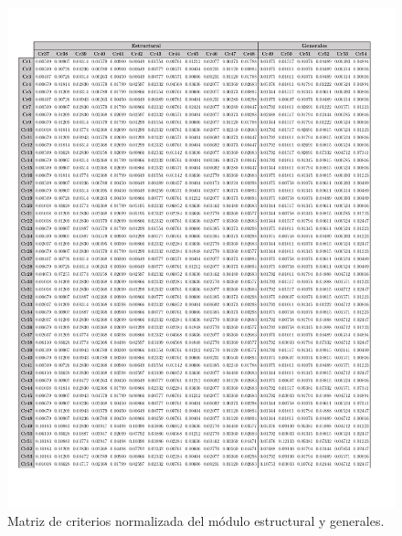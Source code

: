 \newpage
\begin{figure}[H]
	\centering
	\includegraphics[width=15cm]{imagenes/MNormalizada3Ex}
	\caption{Matriz de criterios normalizada del módulo estructural y generales.}
	\label{fig:MNormalizada3Ex}
\end{figure}

